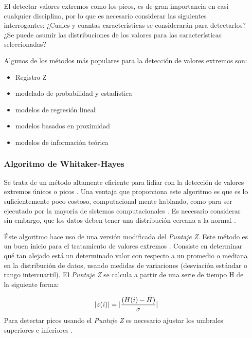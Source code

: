 El detectar valores extremos como los picos, es de gran importancia en casi cualquier disciplina, por lo que es necesario considerar las siguientes interrogantes: ¿Cuales y cuantas características se considerarán para detectarlos?¿Se puede asumir las distribuciones de los valores para las características seleccionadas?
\vspace{1 em}

Algunos de los métodos más populares para la detección de valores extremos son:

\begin{itemize}
    \item Registro Z
    \item modelado de probabilidad y estadística
    \item modelos de regresión lineal
    \item modelos basados en proximidad
    \item modelos de información teórica
\end{itemize}

\subsubsection{Algoritmo de Whitaker-Hayes}
Se trata de un método altamente eficiente para lidiar con la detección de valores extremos únicos o picos \parencite{Dealing_with_outliers}. Una ventaja que proporciona este algoritmo es que es lo suficientemente poco costoso, computacional mente hablando, como para ser ejecutado por la mayoría de sistemas computacionales \parencite{WHITAKER2018}. Es necesario considerar sin embargo, que los datos deben tener una distribución cercana a la normal \parencite{Dealing_with_outliers, brief_overview_outlier-detection}.
\vspace{1 em}

Éste algoritmo hace uso de una versión modificada del \emph{Puntaje Z}. Este método es un buen inicio para el tratamiento de valores extremos \parencite{removing_with_Whitaker-Hayes}. Consiste en determinar qué tan alejado está un determinado valor con respecto a un promedio o mediana en la distribución de datos, usando medidas de variaciones (desviación estándar o rango intercuartil). El \emph{Puntaje Z} se calcula a partir de una serie de tiempo H de la siguiente forma:

\begin{equation}
    |z(i)| = | \frac{(H(i)-\Bar{H})}{\sigma} |
\end{equation}
Para detectar picos usando el \emph{Puntaje Z} es necesario ajustar los umbrales superiores e inferiores \parencite{Dealing_with_outliers, removing_with_Whitaker-Hayes}.
\vspace{1 em}

